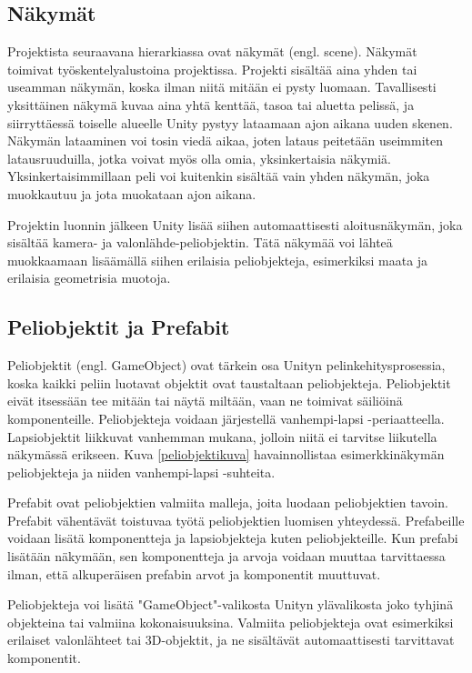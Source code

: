 \documentclass[utf8]{gradu3}
\begin{document}
\subsection{Näkymät}

Projektista seuraavana hierarkiassa ovat näkymät (engl. scene). Näkymät toimivat työskentelyalustoina projektissa. Projekti sisältää aina yhden tai useamman näkymän, koska ilman niitä mitään ei pysty luomaan. Tavallisesti yksittäinen näkymä kuvaa aina yhtä kenttää, tasoa tai aluetta pelissä, ja siirryttäessä toiselle alueelle Unity pystyy lataamaan ajon aikana uuden skenen. Näkymän lataaminen voi tosin viedä aikaa, joten lataus peitetään useimmiten latausruuduilla, jotka voivat myös olla omia, yksinkertaisia näkymiä. Yksinkertaisimmillaan peli voi kuitenkin sisältää vain yhden näkymän, joka muokkautuu ja jota muokataan ajon aikana.

Projektin luonnin jälkeen Unity lisää siihen automaattisesti aloitusnäkymän, joka sisältää kamera- ja valonlähde-peliobjektin. Tätä näkymää voi lähteä muokkaamaan lisäämällä siihen erilaisia peliobjekteja, esimerkiksi maata ja erilaisia geometrisia muotoja.

\subsection{Peliobjektit ja Prefabit}

Peliobjektit (engl. GameObject) ovat tärkein osa Unityn pelinkehitysprosessia, koska kaikki peliin luotavat objektit ovat taustaltaan peliobjekteja. Peliobjektit eivät itsessään tee mitään tai näytä miltään, vaan ne toimivat säiliöinä komponenteille. Peliobjekteja voidaan järjestellä vanhempi-lapsi -periaatteella. Lapsiobjektit liikkuvat vanhemman mukana, jolloin niitä ei tarvitse liikutella näkymässä erikseen. Kuva \ref{peliobjektikuva} havainnollistaa esimerkkinäkymän peliobjekteja ja niiden vanhempi-lapsi -suhteita.

Prefabit ovat peliobjektien valmiita malleja, joita luodaan peliobjektien tavoin. Prefabit vähentävät toistuvaa työtä peliobjektien luomisen yhteydessä. Prefabeille voidaan lisätä komponentteja ja lapsiobjekteja kuten peliobjekteille. Kun prefabi lisätään näkymään, sen komponentteja ja arvoja voidaan muuttaa tarvittaessa ilman, että alkuperäisen prefabin arvot ja komponentit muuttuvat.

Peliobjekteja voi lisätä "GameObject"-valikosta Unityn ylävalikosta joko tyhjinä objekteina tai valmiina kokonaisuuksina. Valmiita peliobjekteja ovat esimerkiksi erilaiset valonlähteet tai 3D-objektit, ja ne sisältävät automaattisesti tarvittavat komponentit.
\end{document}
